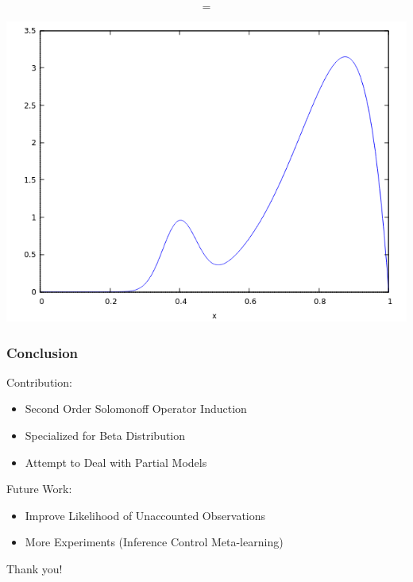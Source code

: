 \documentclass{beamer}
\begin{document}
\begin{frame}[fragile]
\begin{columns}
\end{columns}

$$=$$

\begin{center}\includegraphics[scale=0.2]{images/Beta_mixed_c_0_01_alpha.png}\end{center}

\end{frame}



\begin{frame}
  \frametitle{Conclusion}

  Contribution:
  \begin{itemize}
  \item Second Order Solomonoff Operator Induction
  \item Specialized for Beta Distribution
  \item Attempt to Deal with Partial Models
  \end{itemize}

  \pause
  
  Future Work:
  \begin{itemize}
  \item Improve Likelihood of Unaccounted Observations
  \item More Experiments (Inference Control Meta-learning)
  \end{itemize}

  \pause

  \begin{center}
    Thank you!
  \end{center}

\end{frame}
\end{document}
